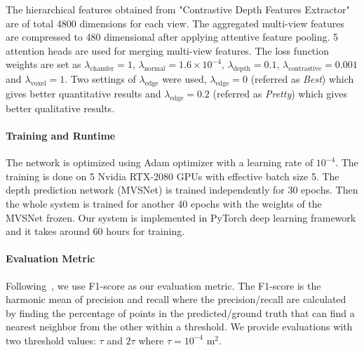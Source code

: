 The hierarchical features obtained from "Contrastive Depth Features Extractor" are of total 4800 dimensions for each view.
The aggregated multi-view features are compressed to 480 dimensional after applying attentive feature pooling.
5 attention heads are used for merging multi-view features.
The loss function weights are set as $\lambda_{\text{chamfer}}=1$, $\lambda_{\text{normal}}=1.6\times10^{-4}$, $\lambda_{\text{depth}}=0.1$, $\lambda_{\text{contrastive}}=0.001$ and $\lambda_{\text{voxel}}=1$.
Two settings of $\lambda_{\text{edge}}$ were used, $\lambda_{\text{edge}}=0$ (referred as \emph{Best}) which gives better quantitative results and $\lambda_{\text{edge}}=0.2$ (referred as \emph{Pretty}) which gives better qualitative results.

\vspace{-4mm}
\paragraph{Training and Runtime}
The network is optimized using Adam optimizer with a learning rate of $10^{-4}$.
The training is done on 5 Nvidia RTX-2080 GPUs with effective batch size 5.
The depth prediction network (MVSNet) is trained independently for 30 epochs.
Then the whole system is trained for another 40 epochs with the weights of the MVSNet frozen.
Our system is implemented in PyTorch deep learning framework and it takes around 60 hours for training.

\vspace{-4mm}
\paragraph{Evaluation Metric}
Following~\cite{wang2018pixel2mesh, wen2019pixel2mesh++}, we use F1-score as our evaluation metric.
The F1-score is the harmonic mean of precision and recall where the precision/recall are calculated by finding the percentage of points in the predicted/ground truth that can find a nearest neighbor from the other within a threshold.
We provide evaluations with two threshold values: $\tau$ and $2\tau$ where $\tau=10^{-4}$  m$^2$.
\vspace{-2mm}
